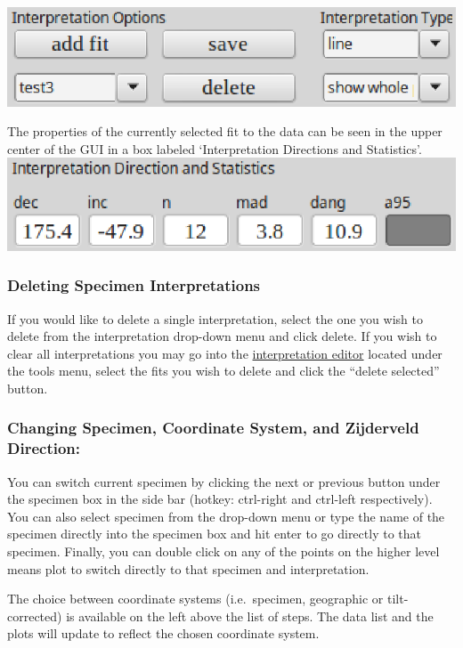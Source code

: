 \documentclass[11pt]{book}
\begin{document}
{\includegraphics[width=10 cm]{EPSFiles/demag_gui_SpecimenMeanType.eps}

\noindent The properties of the currently selected fit to the data can be seen in the upper center of the GUI in a box labeled `Interpretation Directions and Statistics'.\\

\includegraphics[width=10 cm]{EPSFiles/demag_gui_FitData.eps}

\subsubsection{Deleting Specimen
Interpretations}\label{deleting-specimen-interpretations}

\noindent If you would like to delete a single interpretation, select the one you wish to delete from the interpretation drop-down menu and click delete. If you wish to clear all interpretations you may go into the \hyperref[interpretation-editor]{interpretation editor} located under the tools menu, select the fits you wish to delete and click the ``delete selected'' button.\\

\subsubsection{Changing Specimen, Coordinate System, and Zijderveld Direction:}\label{change-specimen-coord-zijd}

You can switch current specimen by clicking the next or previous button under the specimen box in the side bar (hotkey: ctrl-right and ctrl-left respectively). You can also select specimen from the drop-down menu or type the name of the specimen directly into the specimen box and hit enter to go directly to that specimen. Finally, you can double click on any of the points on the higher level means plot to switch directly to that specimen and interpretation.

\noindent The choice between coordinate systems (i.e.~specimen, geographic or tilt-corrected) is available on the left above the list of steps. The data list and the plots will update to reflect the chosen coordinate system.

}
\end{document}

